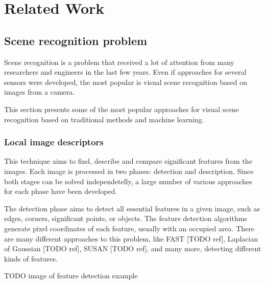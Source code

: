 \chapter{Related Work}\label{chapter:relatedWork}

\section{Scene recognition problem}

Scene recognition is a problem that received a lot of attention from many researchers and engineers in the last few years. Even if approaches for several sensors were developed, the most popular is visual scene recognition based on images from a camera.\par
This section presents some of the most popular approaches for visual scene recognition based on traditional methods and machine learning.

\subsection{Local image descriptors}

This technique aims to find, describe and compare significant features from the images. Each image is processed in two phases: detection and description. Since both stages can be solved independetelly, a large number of various approaches for each phase have been developed.\par
The detection phase aims to detect all essential features in a given image, such as edges, corners, significant points, or objects. The feature detection algorithms generate pixel coordinates of each feature, usually with an occupied area. There are many different approaches to this problem, like FAST [TODO ref], Laplacian of Gaussian [TODO ref], SUSAN [TODO ref], and many more, detecting different kinds of features.\par

TODO image of feature detection example

